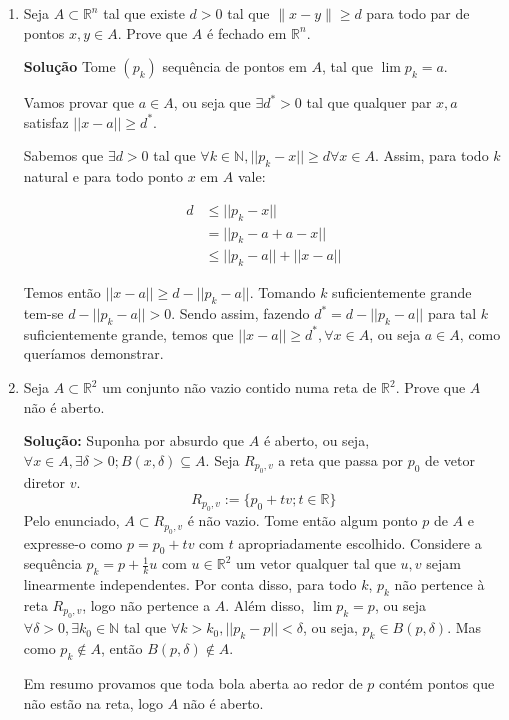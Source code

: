 \documentclass[12pt]{article}
\newcommand{\R}{\mathbb{R}}
\newcommand{\N}{\mathbb{N}}
\newcommand{\rr}{\mathbb{R}^2}
\begin{document}
\begin{enumerate}
\item Seja $A \subset \mathbb{R}^n$ tal que existe $d>0$ tal que $\|x-y\| \geq d$ para todo par de pontos $x,y \in A.$ Prove que $A$ \'e fechado em $\mathbb{R}^n.$ 

\textbf{Solução} Tome $(p_k)$ sequência de pontos em $A$, tal que $\lim p_k = a$.

Vamos provar que $a\in A$, ou seja que $\exists d^*>0$ tal que qualquer par $x,a$ satisfaz $||x-a||\geq d^*$.

Sabemos que $\exists d>0$ tal que $\forall k\in\N,||p_k-x||\geq d\forall x\in A$. Assim, para todo $k$ natural e para todo ponto $x$ em $A$ vale:

\begin{align*}
	d&\leq ||p_k-x||\\
	&=||p_k-a+a-x||\\
	&\leq ||p_k-a||+||x-a||
\end{align*}

Temos então $||x-a||\geq d-||p_k-a||$. Tomando $k$ suficientemente grande tem-se $d-||p_k-a||>0$. Sendo assim, fazendo $d^*=d-||p_k-a||$ para tal $k$ suficientemente grande, temos que $||x-a||\geq d^*,\forall x\in A$, ou seja $a\in A$, como queríamos demonstrar.



\item Seja $A\subset \mathbb{R}^2$ um conjunto n\~ao vazio contido numa reta de $\mathbb{R}^2.$ Prove que $A$ n\~ao \'e aberto.

\textbf{Solução:} Suponha por absurdo que $A$ é aberto, ou seja, $\forall x \in A,\exists \delta>0;B(x,\delta)\subseteq A$. Seja $R_{p_0,v}$ a reta que passa por $p_0$ de vetor diretor $v$.
$$R_{p_0,v}:=\{p_0+tv;t\in \R\}$$
Pelo enunciado, $A\subset R_{p_0,v}$ é não vazio. Tome então algum ponto $p$ de $A$ e expresse-o como $p=p_0+tv$ com $t$ apropriadamente escolhido. Considere a sequência $p_k=p+\frac1ku$ com $u\in\rr$ um vetor qualquer tal que $u,v$ sejam linearmente independentes. Por conta disso, para todo $k$, $p_k$ não pertence à reta $R_{p_0,v}$, logo não pertence a $A$. Além disso, $\lim p_k=p$, ou seja $\forall \delta>0,\exists k_0\in\N$ tal que $\forall k>k_0,||p_k-p||<\delta$, ou seja, $p_k\in B(p,\delta)$. Mas como $p_k\notin A$, então $B(p,\delta)\notin A$.

Em resumo provamos que toda bola aberta ao redor de $p$ contém pontos que não estão na reta, logo $A$ não é aberto.


\end{enumerate}
\end{document}
